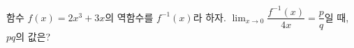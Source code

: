 함수 $f(x)=2x^3+3x$의 역함수를 $f^{-1}(x)$라 하자. $\displaystyle\lim_{x\to 0}\dfrac{f^{-1}(x)}{4x}=\dfrac{p}{q}$일 때, $pq$의 값은? 

